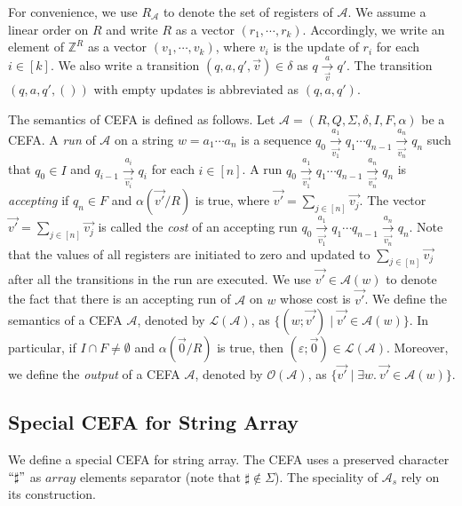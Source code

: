 \documentclass[12pt]{article}
\newcommand*{\aut}{\mathcal{A}}
\newcommand*{\Int}{\mathbb{Z}}
\newcommand*{\myvec}[1]{\vec{#1}}
\newcommand{\cefaout}{\mathcal{O}}
\newcommand{\Lang}{\mathcal{L}}
\newcommand{\arrconcat}{\sharp}
\theoremstyle{remark}
\begin{document}
For convenience, we use $R_\aut$ to denote the set of registers of $\aut$. We assume a linear order on $R$ and write $R$ as a vector $(r_1, \cdots, r_k)$. Accordingly, we write an element of $\Int^R$ as a vector $(v_1, \cdots, v_k)$, where $v_i$ is the update of $r_i$ for each $i \in [k]$. We also write a transition $(q, a, q', \vec{v}) \in \delta$ as $q \xrightarrow[\vec{v}]{a} q'$. The transition $(q,a,q',())$ with empty updates is abbreviated as $(q,a,q')$.

The semantics of CEFA is defined as follows. Let $\aut = (R, Q, \Sigma, \delta, I, F, \alpha)$ be a CEFA. 
A \emph{run} of $\aut$ on a string $w = a_1 \cdots a_n$ is a sequence $q_0 \xrightarrow[\myvec{v_1}]{a_1} q_1 \cdots q_{n-1}\xrightarrow[\myvec{v_n}]{a_n} q_n$ such that $q_0 \in I$ and $q_{i-1} \xrightarrow[\myvec{v_i}]{a_i} q_i$ for each $i \in [n]$. A run $q_0 \xrightarrow[\myvec{v_1}]{a_1} q_1 \cdots q_{n-1}\xrightarrow[\myvec{v_n}]{a_n} q_n$ is \emph{accepting} if $q_n \in F$ and $\alpha(\myvec{v'}/R)$ is true, where $\myvec{v'} = \sum \limits_{j \in [n]} \myvec{v_j}$. The vector $\myvec{v'}= \sum \limits_{j \in [n]} \myvec{v_j}$ is called the \emph{cost} of an accepting run $q_0 \xrightarrow[\myvec{v_1}]{a_1} q_1 \cdots q_{n-1}\xrightarrow[\myvec{v_n}]{a_n} q_n$. Note that the values of all registers are initiated to zero and updated to $\sum \limits_{j \in [n]} \myvec{v_j}$ after all the transitions in the run are executed. We use $\myvec{v'} \in \aut(w)$ to denote the fact that there is an accepting run of $\aut$ on $w$ whose cost is $\myvec{v'}$.  
We define the semantics of a CEFA $\aut$, denoted by $\Lang(\aut)$, as $\{(w; \myvec{v'}) \mid  \myvec{v'} \in \aut(w)\}$.  In particular, if $I \cap F \neq \emptyset$ and $\alpha(\myvec{0}/R)$ is true, then $(\varepsilon; \myvec{0}) \in \Lang(\aut)$. Moreover, we define the \emph{output} of a CEFA $\aut$, denoted by $\cefaout(\aut)$, as $\{\myvec{v'} \mid  \exists w.\ \myvec{v'} \in \aut(w)\}$.


\subsection{Special CEFA for String Array}
We define a special CEFA for string array. The CEFA uses a preserved character $``\arrconcat"$ as $array$ elements separator (note that $\arrconcat\not\in\Sigma$). The speciality of $\aut_s$ rely on  its construction.
\end{document}
